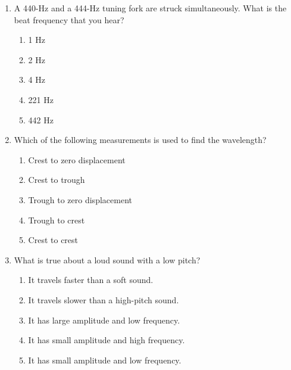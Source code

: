 \documentclass{../../../oss-apphys}
\begin{document}
\begin{multicols}{2}
\begin{enumerate}[leftmargin=18pt,resume]
  \item A 440-Hz and a 444-Hz tuning fork are struck simultaneously. What is
    the beat frequency that you hear?
    \begin{enumerate}[noitemsep,topsep=0pt,leftmargin=18pt,label=(\Alph*)]
    \item 1 Hz
    \item 2 Hz
    \item 4 Hz
    \item 221 Hz
    \item 442 Hz
    \end{enumerate}

  \item Which of the following measurements is used to find the wavelength?
    \begin{enumerate}[noitemsep,topsep=0pt,leftmargin=18pt,label=(\Alph*)]
    \item Crest to zero displacement
    \item Crest to trough
    \item Trough to zero displacement
    \item Trough to crest
    \item Crest to crest
    \end{enumerate}
    
  \item What is true about a loud sound with a low pitch?
    \begin{enumerate}[noitemsep,topsep=0pt,leftmargin=18pt,label=(\Alph*)]
    \item It travels faster than a soft sound.
    \item It travels slower than a high-pitch sound.
    \item It has large amplitude and low frequency.
    \item It has small amplitude and high frequency.
    \item It has small amplitude and low frequency.
  \end{enumerate}
  


\end{enumerate}
\end{multicols}
\end{document}
